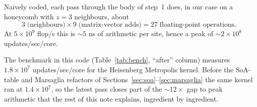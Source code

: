 \documentclass[11pt,letterpaper]{article}
\begin{document}
Naively coded, each pass through the body of step~1 does, in our case
on a honeycomb with $z = 3$ neighbours, about
\[
   3 \;\text{(neighbours)} \times 9 \;\text{(matrix-vector adds)}
   = 27 \;\text{floating-point operations}.
\]
At $5 \times 10^{9}$ flop/s this is $\sim 5$ ns of arithmetic per site,
hence a peak of $\sim 2 \times 10^{8}$ updates/sec/core.

The benchmark in this code (Table~\ref{tab:bench}, ``after'' column)
measures $1.8 \times 10^{7}$ updates/sec/core for the Heisenberg
Metropolis kernel.  Before the SoA-table and Marsaglia refactors of
Sections~\ref{sec:soa}--\ref{sec:marsaglia} the same kernel ran at
$1.4 \times 10^{7}$, so the latest pass closes part of the
$\sim 12\times$ gap to peak arithmetic that the rest of this note
explains, ingredient by ingredient.
\end{document}
